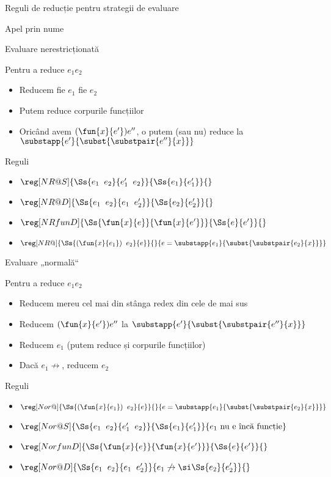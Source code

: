 \documentclass[xcolor=pdftex,romanian,colorlinks]{beamer}
\begin{document}
\begin{subsection}{Reguli de reducție pentru strategii de evaluare}
\begin{frame}{Apel prin nume}
\end{frame}

\begin{frame}{Evaluare nerestricționată}
\begin{block}{}
Pentru a reduce $e_1 \mathrel{} e_2$
\begin{itemize}
\item Reducem fie $e_1$ fie $e_2$
\item Putem reduce corpurile funcțiilor
\item Oricând avem  $(\fun{x}{e'}) e''$, o putem (sau nu)
reduce la $\substapp{e'}{\subst{\substpair{e''}{x}}}$
\end{itemize} 
\end{block}

\begin{block}{Reguli}
\begin{itemize}
\item[]$\reg[NR@S]{\Ss{e_1\mathrel{}e_2}{e_1'\mathrel{}e_2}}{\Ss{e_1}{e_1'}}{}$
\item[]$\reg[NR@D]{\Ss{e_1\mathrel{}e_2}{e_1\mathrel{}e_2'}}{\Ss{e_2}{e_2'}}{}$
\item[]$\reg[NRfunD]{\Ss{\fun{x}{e}}{\fun{x}{e'}}}{\Ss{e}{e'}}{}$
\item[]$\reg[NR@]{\Ss{(\fun{x}{e_1})\mathrel{}e_2}{e}}{}{e = \substapp{e_1}{\subst{\substpair{e_2}{x}}}}$
\end{itemize}
\end{block}
\end{frame}

\begin{frame}{Evaluare „normală“}
\begin{block}{}
Pentru a reduce $e_1 \mathrel{} e_2$
\begin{itemize}
\item Reducem mereu cel mai din stânga redex din cele de mai sus
\item Reducem $(\fun{x}{e'}) e''$ la $\substapp{e'}{\subst{\substpair{e''}{x}}}$
\item Reducem $e_1$ (putem reduce și corpurile funcțiilor)
\item Dacă $e_1\not\rightarrow$, reducem $e_2$
\end{itemize} 
\end{block}

\begin{block}{Reguli}
\begin{itemize}
\item[]$\reg[Nor@]{\Ss{(\fun{x}{e_1})\mathrel{}e_2}{e}}{}{e = \substapp{e_1}{\subst{\substpair{e_2}{x}}}}$
\item[]$\reg[Nor@S]{\Ss{e_1\mathrel{}e_2}{e_1'\mathrel{}e_2}}{\Ss{e_1}{e_1'}}{e_1 \mbox{ nu e încă funcție}}$
\item[]$\reg[NorfunD]{\Ss{\fun{x}{e}}{\fun{x}{e'}}}{\Ss{e}{e'}}{}$
\item[]$\reg[Nor@D]{\Ss{e_1\mathrel{}e_2}{e_1\mathrel{}e_2'}}{\displaystyle e_1\not\rightarrow \si \Ss{e_2}{e_2'}}{}$
\end{itemize}
\end{block}
\end{frame}



\end{subsection}
\end{document}
